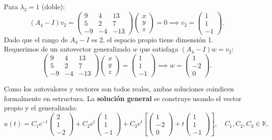 {\begin{itemize}
        Para $\lambda_2 = 1$ (doble):
        \[
            (A_4 - I)v_2 = \begin{pmatrix} 9 & 4 & 13 \\ 5 & 2 & 7 \\ -9 & -4 & -13 \end{pmatrix}\begin{pmatrix} x \\ y \\ z \end{pmatrix} = 0 \implies v_2 = \begin{pmatrix} 1 \\ 1 \\ -1 \end{pmatrix}.
        \]
        Dado que el rango de $A_4 - I$ es 2, el espacio propio tiene dimensión 1. Requerimos de un autovector generalizado $w$ que satisfaga $(A_4 - I)w = v_2$:
        \[
            \begin{pmatrix} 9 & 4 & 13 \\ 5 & 2 & 7 \\ -9 & -4 & -13 \end{pmatrix} \begin{pmatrix} x \\ y \\ z \end{pmatrix} = \begin{pmatrix} 1 \\ 1 \\ -1 \end{pmatrix} \implies w = \begin{pmatrix} 1 \\ -2 \\ 0 \end{pmatrix}.
        \]
        
        Como los autovalores y vectores son todos reales, ambas soluciones coindicen formalmente en estructura. La \textbf{solución general} se construye usando el vector propio y el generalizado:
        \[
            u(t) = C_1 e^{-t} \begin{pmatrix} 2 \\ 1 \\ -2 \end{pmatrix} + C_2 e^{t} \begin{pmatrix} 1 \\ 1 \\ -1 \end{pmatrix} + C_3 e^t \left[ \begin{pmatrix} 1 \\ -2 \\ 0 \end{pmatrix} + t \begin{pmatrix} 1 \\ 1 \\ -1 \end{pmatrix} \right], \quad C_1, C_2, C_3 \in \mathbb{K}.
        \]
    \end{itemize}    
}

